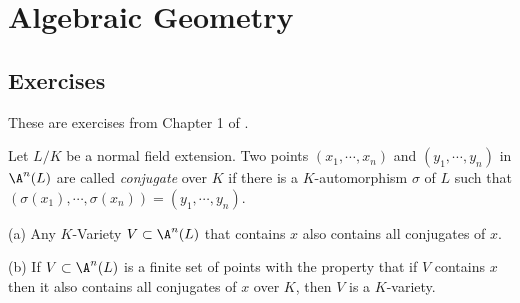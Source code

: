 \documentclass[oneside,12pt]{amsart}
\begin{document}

\section{Algebraic Geometry}


\subsection{Exercises}
These are exercises from Chapter 1 of \cite{Kunz_Book}.

\begin{exercise}
Let $L/K$ be a normal field extension. Two points $(x_1,\cdots,x_n)$ and $(y_1,\cdots,y_n)$ in
$\A^n(L)$ are called \emph{conjugate} over $K$ if there is a $K$-automorphism $\sigma$ of $L$
such that $(\sigma(x_1),\cdots,\sigma(x_n))=(y_1,\cdots,y_n)$.

(a) Any $K$-Variety $V\subset\A^n(L)$ that contains $x$ also contains all conjugates of $x$.

(b) If $V\subset\A^n(L)$ is a finite set of points with the property that if $V$ contains $x$
then it also contains all conjugates of $x$ over $K$, then $V$ is a $K$-variety.
\end{exercise}
\end{document}
